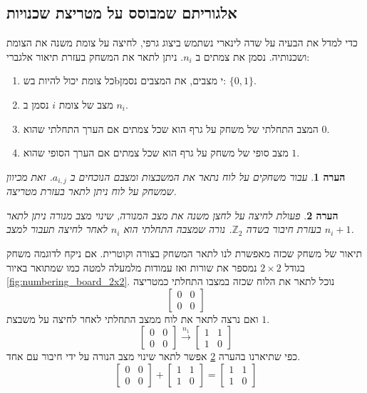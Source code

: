 \documentclass[12pt,leqno]{article}
\theoremstyle{theoremdd}
\newtheorem{comm}{הערה}
\begin{document}
\subsection{אלגוריתם שמבוסס על מטריצת שכנויות}
כדי למדל את הבעיה על שדה לינארי
נשתמש ביצוג גרפי, לחיצה על צומת משנה את הצומת ושכנותיה.
נסמן את צמתים ב
$n_i$.
ניתן לתאר את המשחק בעזרת תיאור אלגברי:
\begin{enumerate}
    \item 
כל צומת יכול להיות בשbי מצבים,
את המצבים נסמן:
    $\{0,1\}$.
    \item 
מצב של צומת 
    $i$
נסמן ב
    $n_i$.
    \item 
המצב התחלתי של משחק על גרף הוא שכל צמתים אם הערך התחלתי
שהוא 
$0$.
    \item 
מצב סופי של משחק
על גרף הוא שכל צמתים 
אם הערך הסופי
שהוא
$1$.
\end{enumerate}
\begin{comm}
    עבור משחקים על לוח נתאר את המשבצות ומצבם הנוכחים ב
    $a_{i,j}$.
    זאת מכיוון שמשחק על לוח ניתן לתאר בעזרת מטריצה.
\end{comm}
\begin{comm}
\label{comm: sum as press operator on board}
פעולת לחיצה על לחצן משנה 
את מצב המנורה,
שינוי מצב מנורה ניתן לתאר בעזרת חיבור בשדה 
$\mathbb{Z}_2$.
נורה שמצבה התחלתי הוא
$n_i$
לאחר לחיצה תעבור למצב
$n_i + 1$.
\end{comm}
תיאור של משחק שכזה מאפשרת לנו
לתאר המשחק בצורה וקוטרית.
אם ניקח לדוגמה
משחק בגודל
$2 \times 2$
נמספר את 
שורות ואז עמודות מלמעלה למטה כמו שמתואר באיור
\ref{fig:numbering_board_2x2}.
נוכל לתאר את הלוח 
שכזה במצבו התחלתי כמטריצה
\[\begin{bmatrix}
0 & 0 \\
0 & 0 
\end{bmatrix}\]
ואם נרצה לתאר את לוח ממצב התחלתי לאחר לחיצה על משבצת 
$1$.
\[ 
    \begin{bmatrix}
    0 & 0 \\
    0 & 0 
    \end{bmatrix} \stackrel{n_1}{\longrightarrow}
    \begin{bmatrix}
    1 & 1 \\
    1 & 0 
    \end{bmatrix}
 \]
 כפי שתיארנו 
 בהערה 
 \ref{comm: sum as press operator on board}
 אפשר לתאר שינוי מצב הנורה על ידי חיבור 
 עם אחד.
\[
    \begin{bmatrix}
    0 & 0 \\
    0 & 0 
    \end{bmatrix} + 
    \begin{bmatrix}
    1 & 1 \\
    1 & 0 
    \end{bmatrix}=
    \begin{bmatrix}
    1 & 1 \\
    1 & 0 
    \end{bmatrix} 
\]  
\end{document}
